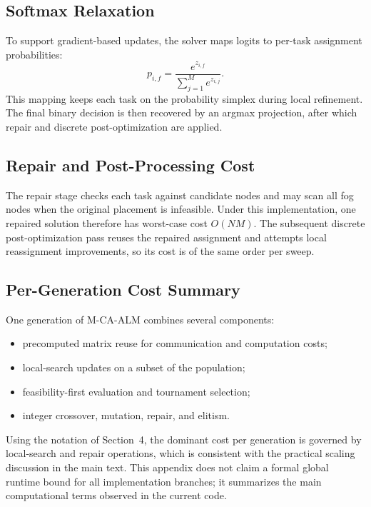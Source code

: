 \documentclass[pdflatex,sn-mathphys-num]{sn-jnl}
\begin{document}
\begin{appendices}
\subsection{Softmax Relaxation}
\label{appendix:relaxation}
To support gradient-based updates, the solver maps logits to per-task assignment probabilities:
\begin{equation}
    p_{i,f} = \frac{e^{z_{i,f}}}{\sum_{j=1}^{M} e^{z_{i,j}}}.
\end{equation}
This mapping keeps each task on the probability simplex during local refinement. The final binary decision is then recovered by an argmax projection, after which repair and discrete post-optimization are applied.

\subsection{Repair and Post-Processing Cost}
\label{appendix:complexity}
The repair stage checks each task against candidate nodes and may scan all fog nodes when the original placement is infeasible. Under this implementation, one repaired solution therefore has worst-case cost $O(NM)$. The subsequent discrete post-optimization pass reuses the repaired assignment and attempts local reassignment improvements, so its cost is of the same order per sweep.

\subsection{Per-Generation Cost Summary}
One generation of M-CA-ALM combines several components:
\begin{itemize}
    \item precomputed matrix reuse for communication and computation costs;
    \item local-search updates on a subset of the population;
    \item feasibility-first evaluation and tournament selection;
    \item integer crossover, mutation, repair, and elitism.
\end{itemize}
Using the notation of Section~4, the dominant cost per generation is governed by local-search and repair operations, which is consistent with the practical scaling discussion in the main text. This appendix does not claim a formal global runtime bound for all implementation branches; it summarizes the main computational terms observed in the current code.
\end{appendices}
\end{document}
